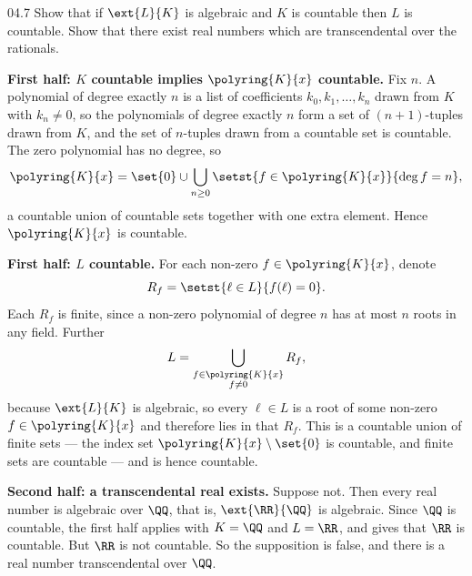 \documentclass[11pt]{article}
\begin{document}
\begin{problem}{04.7}
  Show that if $\ext{L}{K}$ is algebraic and $K$ is countable then $L$ is
  countable. Show that there exist real numbers which are transcendental over
  the rationals.
\end{problem}
\begin{solution}
  \textbf{First half: $K$ countable implies $\polyring{K}{x}$ countable.} Fix
  $n$. A polynomial of degree exactly $n$ is a list of coefficients
  $k_{0}, k_{1}, \dots, k_{n}$ drawn from $K$ with $k_{n} \neq 0$, so the
  polynomials of degree exactly $n$ form a set of $(n+1)$-tuples drawn from
  $K$, and the set of $n$-tuples drawn from a countable set is countable. The
  zero polynomial has no degree, so
  \[
    \polyring{K}{x}
      = \set{0} \cup \bigcup_{n \geq 0}
        \setst{f \in \polyring{K}{x}}{\deg f = n},
  \]
  a countable union of countable sets together with one extra element. Hence
  $\polyring{K}{x}$ is countable.

  \medskip
  \textbf{First half: $L$ countable.} For each non-zero
  $f \in \polyring{K}{x}$, denote
  \[
    R_{f} = \setst{\ell \in L}{f(\ell) = 0}.
  \]
  Each $R_{f}$ is finite, since a non-zero polynomial of degree $n$ has at most
  $n$ roots in any field. Further
  \[
    L = \bigcup_{\substack{f \in \polyring{K}{x} \\ f \neq 0}} R_{f},
  \]
  because $\ext{L}{K}$ is algebraic, so every $\ell \in L$ is a root of some
  non-zero $f \in \polyring{K}{x}$ and therefore lies in that $R_{f}$. This is
  a countable union of finite sets --- the index set
  $\polyring{K}{x} \setminus \set{0}$ is countable, and finite sets are
  countable --- and is hence countable.

  \medskip
  \textbf{Second half: a transcendental real exists.} Suppose not. Then every
  real number is algebraic over $\QQ$, that is, $\ext{\RR}{\QQ}$ is algebraic.
  Since $\QQ$ is countable, the first half applies with $K = \QQ$ and
  $L = \RR$, and gives that $\RR$ is countable. But $\RR$ is not countable.
  So the supposition is false, and there is a real number transcendental over
  $\QQ$.
\end{solution}
\end{document}
